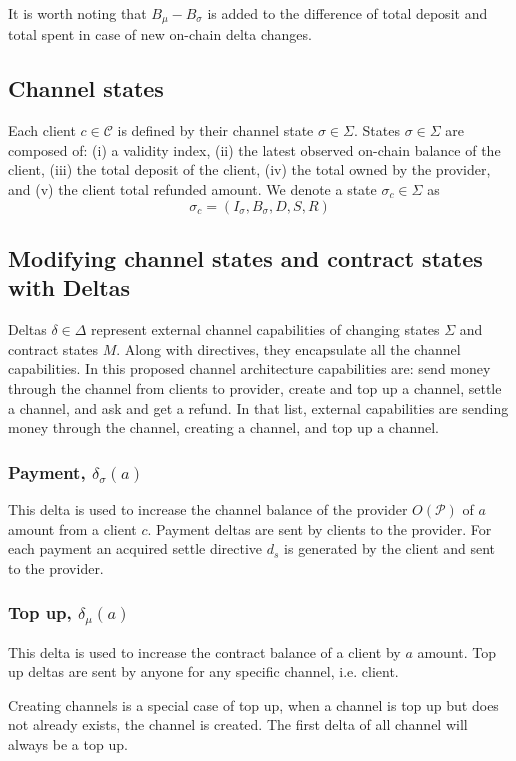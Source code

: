\documentclass{llncs}
\begin{document}
It is worth noting that $B_\mu - B_\sigma$ is added to the difference of total deposit and total spent in case of new on-chain delta changes.

\subsection{Channel states} Each client $c \in \mathcal{C}$ is defined by their channel state $\sigma \in \Sigma$. States $\sigma \in \Sigma$ are composed of: (i) a validity index, (ii) the latest observed on-chain balance
of the client, (iii) the total deposit of the client, (iv) the total owned by the provider, and (v) the client total refunded amount. We denote a state $\sigma_c \in \Sigma$ as
$$\sigma_c = (I_\sigma, B_\sigma, D, S,R)$$

\subsection{Modifying channel states and contract states with Deltas} Deltas $\delta \in \Delta$ represent external channel capabilities of changing states $\Sigma$ and contract states $M$. Along with directives, they encapsulate all the channel capabilities. In this proposed channel architecture capabilities are: send money through the channel from clients to provider, create and top up a channel, settle a channel, and ask and get a refund. In that list, external capabilities are sending money through the channel, creating a channel, and top up a channel.

\subsubsection{Payment, $\delta_\sigma(a)$} This delta is used to increase the channel balance of the provider $O(\mathcal{P})$ of $a$ amount from a client $c$. Payment deltas are sent by clients to the provider. For each payment an acquired settle directive $d_s$ is generated by the client and sent to the provider.

\subsubsection{Top up, $\delta_\mu(a)$} This delta is used to increase the contract balance of a client by $a$ amount. Top up deltas are sent by anyone for any specific channel, i.e. client.

Creating channels is a special case of top up, when a channel is top up but does not already exists, the channel is created. The first delta of all channel will always be a top up.
\end{document}

